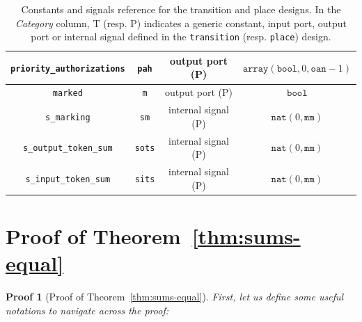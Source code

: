 \documentclass[pdflatex,sn-mathphys]{sn-jnl}%
\theoremstyle{thmstyleone}%
\theoremstyle{thmstyletwo}%
\newtheorem*{pf}{Proof}%
\theoremstyle{thmstylethree}%
\begin{document}
\begin{appendices}
\begin{table}[h]
{\begin{tabular}{|c|c|c|c|}
    \hline
    \texttt{priority\_authorizations} & \texttt{pah} & output port (P) & $\mathtt{array}(\mathtt{bool},0,\mathtt{oan}-1)$ \\
    \hline
    \texttt{marked} & \texttt{m} & output port (P) & $\mathtt{bool}$ \\
    \hline
    \texttt{s\_marking} & \texttt{sm} & internal signal (P) & $\mathtt{nat}(0,\mathtt{mm})$ \\
    \hline
    \texttt{s\_output\_token\_sum} & \texttt{sots} & internal signal (P) & $\mathtt{nat}(0,\mathtt{mm})$ \\
    \hline
    \texttt{s\_input\_token\_sum} & \texttt{sits} & internal signal (P) & $\mathtt{nat}(0,\mathtt{mm})$ \\
    \hline
  \end{tabular}}
  \caption[Constants and signals reference for the \hvhdl{}
  \texttt{transition} and \texttt{place} designs.]{Constants and
    signals reference for the \hvhdl{} transition and place
    designs. In the \textit{Category} column, T (resp. P) indicates a
    generic constant, input port, output port or internal signal
    defined in the \texttt{transition} (resp. \texttt{place})
    design. }
  \label{tab:consts-and-sigs-ref}
\end{table}

\section{Proof of Theorem~\ref{thm:sums-equal}}
\label{sec:sums-equal-pf}

\begin{pf}[Proof of Theorem~\ref{thm:sums-equal}]

  First, let us define some useful notations to navigate across
  the proof:


\end{pf}
\end{appendices}
\end{document}
